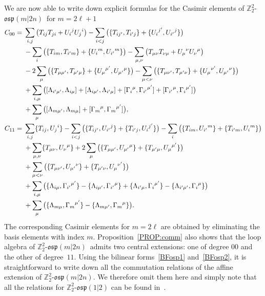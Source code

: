 \documentclass[10pt,a4paper]{amsart}
\numberwithin{equation}{section}
\theoremstyle{definition}
\def\nn{\notag}
\def\Z2{\mathbb{Z}_2^2}
\def\osp{\mathfrak{osp}}
\def\Zosp{$\Z2$-$\osp(m|2n)$}
\begin{document}
We are now able to write down explicit formulas for the Casimir elements of \Zosp\ for $m = 2\ell+1$
\begin{align*}
	C_{00}={}& \sum_{i,j} \big( T_{ij}T_{ji} + {U_{i}}^{j}{U_{j}}^{i} \big) - \sum_{i<j} \big( \{T_{ij'},T_{i'j}\} + \{{U_{i}}^{j'},{U_{i'}}^{j}\} \big) \nn\\
	&-\sum_i \big( \{T_{im},T_{i'm}\} + \{{U_{i}}^m,{U_{i'}}^m\} \big)
	 - \sum_{\mu,\nu} \big( T_{\mu\nu}T_{\nu\mu} + {U_{\mu}}^{\nu}{U_{\nu}}^{\mu} \big) \nn\\
	&- 2\sum_\mu\big( \{T_{\mu\mu'},T_{\mu'\mu}\} + \{{U_{\mu}}^{\mu'},{U_{\mu'}}^{\mu}\} \big) - \sum_{\mu<\nu}\big( \{T_{\mu\nu'},T_{\mu'\nu}\} + \{{U_{\mu}}^{\nu'},{U_{\mu'}}^{\nu}\} \big) \nn\\
	&+ \sum_{i,\mu} \big( [\Lambda_{i'\mu'},\Lambda_{i\mu}] + [\Lambda_{i\mu'},\Lambda_{i'\mu}] + [{\Gamma_{i}}^{\mu},{\Gamma_{i'}}^{\mu'}] + [{\Gamma_{i'}}^{\mu},{\Gamma_{i}}^{\mu'}] \big) \nn\\
	&+ \sum_{\mu}\big( [\Lambda_{m\mu'},\Lambda_{m\mu}] + [{\Gamma_m}^{\mu},{\Gamma_m}^{\mu'}] \big),
\\
	C_{11}={}& \sum_{i,j} \{T_{ij},{U_j}^{i}\} - \sum_{i<j} \big( \{T_{ij'},{U_{i'}}^{j}\} + \{T_{i'j},{U_{i}}^{j'}\} \big) - \sum_{i}\big( \{T_{im},{U_{i'}}^m\} + \{T_{i'm},{U_{i}}^m\} \big) \nn\\
	&+ \sum_{\mu,\nu} \{T_{\mu\nu},{U_{\nu}}^{\mu}\} + 2 \sum_{\mu} \big( \{T_{\mu\mu'},{U_{\mu'}}^{\mu}\} + \{T_{\mu'\mu},{U_{\mu}}^{\mu'}\} \big) \nn\\
	&+ \sum_{\mu<\nu} \big( \{T_{\mu\nu'},{U_{\mu'}}^{\nu}\} + \{T_{\mu'\nu},{U_{\mu}}^{\nu'}\} \big) \nn\\
	&+ \sum_{i,\mu} \big( \{\Lambda_{i\mu},{\Gamma_{i'}}^{\mu'}\} - \{\Lambda_{i\mu'},{\Gamma_{i'}}^{\mu}\} + \{\Lambda_{i'\mu},{\Gamma_{i}}^{\mu'}\} - \{\Lambda_{i'\mu'},{\Gamma_{i}}^{\mu}\}\big) \nn\\
	&+ \sum_\mu \big( \{\Lambda_{m\mu},{\Gamma_{m}}^{\mu'}\} - \{\Lambda_{m\mu'},{\Gamma_{m}}^{\mu}\} \big).
\end{align*}
The corresponding Casimir elements for $m = 2\ell$ are obtained by eliminating the basis elements with index $m$.
Proposition~\ref{PROP:comm} also shows that the loop algebra of \Zosp\ admits two central extensions: one of degree $00$ and the other of degree~$11$.
Using the bilinear forms~\eqref{BFosp1} and~\eqref{BFosp2}, it is straightforward to write down all the commutation relations of the affine extension of \Zosp.
We therefore omit them here and simply note that all the relations for $\Z2$-$\osp(1|2)$ can be found in~\cite{AiSe}.
\end{document}
